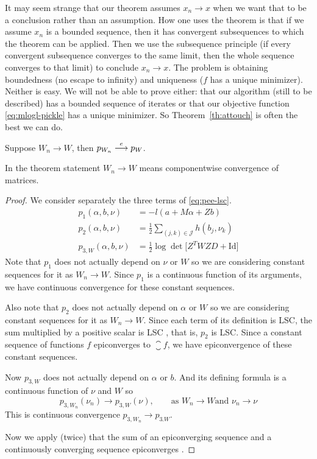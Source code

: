 It may seem strange that our theorem assumes $x_n \to x$ when we want
that to be a conclusion rather than an assumption.  How one uses the
theorem is that if we assume $x_n$ is a bounded sequence, then it has
convergent subsequences to which the theorem can be applied.  Then
we use the subsequence principle (if every convergent subsequence converges
to the same limit, then the whole sequence converges to that limit) to
conclude $x_n \to x$.  The problem is obtaining boundedness (no escape
to infinity) and uniqueness ($f$ has a unique minimizer).  Neither is
easy.  We will not be able to prove either: that our algorithm (still
to be described) has a bounded sequence of iterates or that our objective
function \eqref{eq:mlogl-pickle} has a unique minimizer.
So Theorem~\ref{th:attouch} is often the best we can do.

\begin{theorem} \label{th:pee-epi}
Suppose $W_n \to W$, then $p_{W_n} \stackrel{e}{\longrightarrow} p_{W}$.
\end{theorem}
In the theorem statement $W_n \to W$ means
componentwise convergence of matrices.
\begin{proof}
We consider separately the three terms of \eqref{eq:pee-lsc}.
\begin{align*}
   p_1(\alpha, b, \nu)
   & =
   - l(a + M \alpha + Z b)
   \\
   p_2(\alpha, b, \nu)
   & =
   \tfrac{1}{2} \sum_{(j, k) \in \mathcal{J}} h(b_j, \nu_k)
   \\
   p_{3, W}(\alpha, b, \nu)
   & =
   \tfrac{1}{2} \log \det \bigl[ Z^T W Z D + \text{Id} \bigr]
\end{align*}
Note that $p_1$ does not actually depend on $\nu$ or $W$ so we are
considering constant sequences for it as $W_n \to W$.  Since $p_1$
is a continuous function of its arguments, we have continuous convergence
for these constant sequences.

Also note that $p_2$ does not actually depend on $\alpha$ or $W$ so we are
considering constant sequences for it as $W_n \to W$.  Since each term of
its definition is LSC, the sum multiplied by a positive scalar is LSC
\citet[Theorem~1.39]{rockafellar-wets}, that is, $p_2$ is LSC.
Since a constant sequence of functions $f$ epiconverges to $\closure f$,
we have epiconvergence of these constant sequences.

Now $p_{3, W}$ does not actually depend on $\alpha$ or $b$.  And its
defining formula is a continuous function of $\nu$ and $W$ so
$$
   p_{3, W_n}(\nu_n) \to p_{3, W}(\nu), \qquad \text{as $W_n \to W$
   and $\nu_n \to \nu$}
$$
This is continuous convergence $p_{3, W_n} \to p_{3. W}$.

Now we apply (twice) that the sum of an epiconverging sequence
and a continuously converging sequence epiconverges
\citep[Theorem~7.46 (b)]{rockafellar-wets}.
\end{proof}

